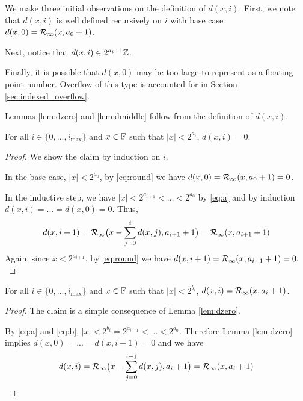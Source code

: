     We make three initial observations on the definition of $d(x, i)$. First,
    we note that $d(x, i)$ is well defined recursively on $i$ with base case
    $d(x, 0) = \mathcal{R}_\text{$\infty$}(x, a_0 + 1)$.

    Next, notice that $d(x, i) \in 2^{a_{i} + 1}\mathbb{Z}$.

    Finally, it is possible that $d(x, 0)$ may be too large to represent as a
    floating point number. Overflow of this type is accounted for in Section
    \ref{sec:indexed_overflow}.

    Lemmas \ref{lem:dzero} and \ref{lem:dmiddle} follow from the definition of $d(x, i)$.

    \begin{samepage}
    \begin{lem}
      For all $i \in \{0, ..., i_{\max}\}$ and $x \in \mathbb{F}$ such that $|x| < 2^{a_i}$,
      $d(x, i) = 0.$
      \label{lem:dzero}
    \end{lem}
    \end{samepage}

    \begin{proof}
      We show the claim by induction on $i$.

      In the base case, $|x| < 2^{a_0}$, by \eqref{eq:round} we have
      $d(x, 0) = \mathcal{R}_\text{$\infty$}(x, a_0 + 1) = 0$.

      In the inductive step, we have $|x| < 2^{a_{i + 1}} < \ldots < 2^{a_0}$ by \eqref{eq:a}
      and by induction $d(x, i)= ... = d(x, 0) = 0$. Thus,
      \[
        d(x, i + 1) = \mathcal{R}_\text{$\infty$}\bigl(x - \sum\limits_{j = 0}^{i}d(x, j), a_{i + 1} + 1\bigr)
            = \mathcal{R}_\text{$\infty$}(x, a_{i+1} + 1)
      \]
      Again, since $x < 2^{a_{i+1}}$, by \eqref{eq:round} we have
      \(
        d(x, i + 1) = \mathcal{R}_\text{$\infty$}(x, a_{i + 1} + 1) = 0.
      \)
    \end{proof}

    \begin{samepage}
    \begin{lem}
      For all $i \in \{0, ..., i_{\max}\}$ and $x \in \mathbb{F}$ such that $|x| < 2^{b_i}$,
      $d(x, i) = \mathcal{R}_\text{$\infty$}(x, a_i + 1)$.
      \label{lem:dmiddle}
    \end{lem}
    \end{samepage}

    \begin{proof}
      The claim is a simple consequence of Lemma \ref{lem:dzero}.

      By  \eqref{eq:a} and \eqref{eq:b}, $|x| < 2^{b_i} = 2^{a_{i - 1}} < \ldots <2^{a_0}$.
      Therefore Lemma \ref{lem:dzero} implies $d(x, 0) = ... = d(x, i - 1) = 0$
      and we have
      \[
        d(x, i) = \mathcal{R}_\text{$\infty$}\bigl(x - \sum\limits_{j = 0}^{i - 1}d(x, j), a_{i} + 1\bigr)
            = \mathcal{R}_\text{$\infty$}(x, a_{i} + 1)
      \]
    \end{proof}

